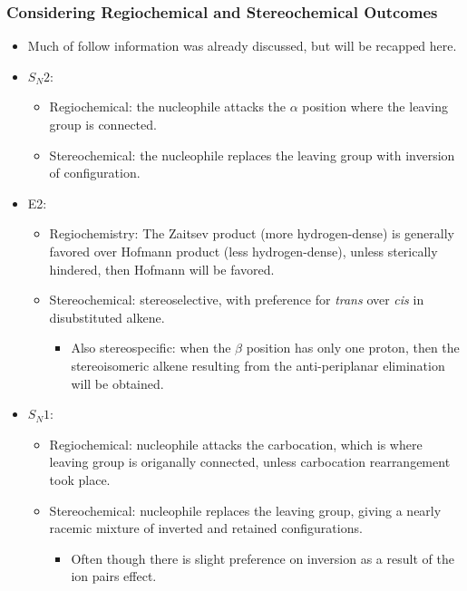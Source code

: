 \documentclass[12pt,a4paper]{article}
\begin{document}
\begin{itemize}
    \subsubsection{Considering Regiochemical and Stereochemical Outcomes}
    \begin{itemize}
        \item Much of follow information was already discussed, but will be recapped here.
        \item \(S_N2\):
            \begin{itemize}
                \item Regiochemical: the nucleophile attacks the $\alpha$ position where the leaving group is connected.
                \item Stereochemical: the nucleophile replaces the leaving group with inversion of configuration. 
            \end{itemize}
        \item E2: 
            \begin{itemize}
                \item Regiochemistry: The Zaitsev product (more hydrogen-dense) is generally favored over Hofmann product (less hydrogen-dense), unless sterically hindered, then Hofmann will be favored.
                \item Stereochemical: stereoselective, with preference for \textit{trans} over \textit{cis} in disubstituted alkene.
                    \begin{itemize}
                        \item Also stereospecific: when the $\beta$ position has only one proton, then the stereoisomeric alkene resulting from the anti-periplanar elimination will be obtained.
                    \end{itemize}
            \end{itemize}
        \item \(S_N1\):
            \begin{itemize}
                \item Regiochemical: nucleophile attacks the carbocation, which is where leaving group is origanally connected, unless carbocation rearrangement took place.
                \item Stereochemical: nucleophile replaces the leaving group, giving a nearly racemic mixture of inverted and retained configurations.
                    \begin{itemize}
                        \item Often though there is slight preference on inversion as a result of the ion pairs effect.

\end{itemize}
\end{itemize}
\end{itemize}
\end{itemize}
\end{document}
